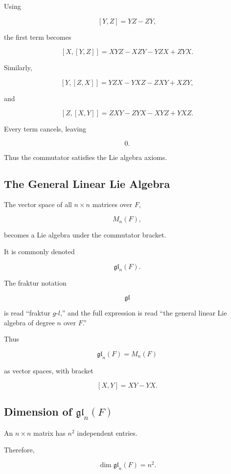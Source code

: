 Using

\[ [Y,Z]=YZ-ZY, \]

the first term becomes

\[ [X,[Y,Z]]=XYZ-XZY-YZX+ZYX. \]

Similarly,

\[ [Y,[Z,X]]=YZX-YXZ-ZXY+XZY, \]

and

\[ [Z,[X,Y]]=ZXY-ZYX-XYZ+YXZ. \]

Every term cancels, leaving

\[ 0. \]

Thus the commutator satisfies the Lie algebra axioms.

\subsection{The General Linear Lie Algebra}
\label{subsec:general-linear-lie-algebra}

The vector space of all \(n\times n\) matrices over \(F\),

\[ M_n(F), \]

becomes a Lie algebra under the commutator bracket.

It is commonly denoted

\[ \mathfrak{gl}_n(F). \]

The fraktur notation

\[ \mathfrak{gl} \]

is read ``fraktur \(g\)-\(l\),'' and the full expression is read
``the general linear Lie algebra of degree \(n\) over \(F\).''

Thus

\[ \mathfrak{gl}_n(F)=M_n(F) \]

as vector spaces, with bracket

\[ [X,Y]=XY-YX. \]

\subsection{Dimension of \(\mathfrak{gl}_n(F)\)}
\label{subsec:dimension-gln}

An \(n\times n\) matrix has \(n^2\) independent entries.

Therefore,

\[ \boxed{\dim\mathfrak{gl}_n(F)=n^2.} \]

